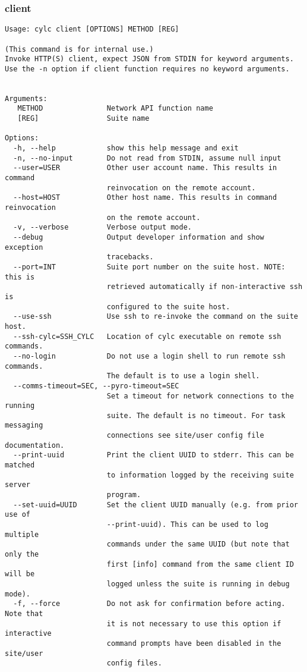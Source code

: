 \subsubsection{client}
\label{client}
\begin{lstlisting}
Usage: cylc client [OPTIONS] METHOD [REG] 

(This command is for internal use.)
Invoke HTTP(S) client, expect JSON from STDIN for keyword arguments.
Use the -n option if client function requires no keyword arguments.


Arguments:
   METHOD               Network API function name
   [REG]                Suite name

Options:
  -h, --help            show this help message and exit
  -n, --no-input        Do not read from STDIN, assume null input
  --user=USER           Other user account name. This results in command
                        reinvocation on the remote account.
  --host=HOST           Other host name. This results in command reinvocation
                        on the remote account.
  -v, --verbose         Verbose output mode.
  --debug               Output developer information and show exception
                        tracebacks.
  --port=INT            Suite port number on the suite host. NOTE: this is
                        retrieved automatically if non-interactive ssh is
                        configured to the suite host.
  --use-ssh             Use ssh to re-invoke the command on the suite host.
  --ssh-cylc=SSH_CYLC   Location of cylc executable on remote ssh commands.
  --no-login            Do not use a login shell to run remote ssh commands.
                        The default is to use a login shell.
  --comms-timeout=SEC, --pyro-timeout=SEC
                        Set a timeout for network connections to the running
                        suite. The default is no timeout. For task messaging
                        connections see site/user config file documentation.
  --print-uuid          Print the client UUID to stderr. This can be matched
                        to information logged by the receiving suite server
                        program.
  --set-uuid=UUID       Set the client UUID manually (e.g. from prior use of
                        --print-uuid). This can be used to log multiple
                        commands under the same UUID (but note that only the
                        first [info] command from the same client ID will be
                        logged unless the suite is running in debug mode).
  -f, --force           Do not ask for confirmation before acting. Note that
                        it is not necessary to use this option if interactive
                        command prompts have been disabled in the site/user
                        config files.
\end{lstlisting}
